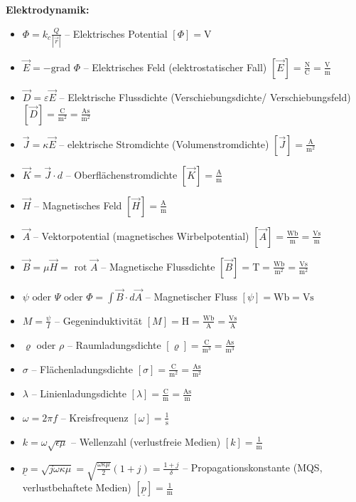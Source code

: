 \textbf{Elektrodynamik:}
\begin{itemize}
\item $\Phi = k_c \frac{Q}{|\vec{r}|}$ -- Elektrisches Potential \hfill $[\Phi] = \text{V}$
\item $\vec{E} = -\text{grad } \Phi$ -- Elektrisches Feld (elektrostatischer Fall) \hfill $[\vec{E}] = \frac{\text{N}}{\text{C}} = \frac{\text{V}}{\text{m}}$
\item $\vec{D} = \varepsilon \vec{E}$ -- Elektrische Flussdichte (Verschiebungsdichte/ Verschiebungsfeld) \hfill $[\vec{D}] = \frac{\text{C}}{\text{m}^2} = \frac{\text{As}}{\text{m}^2}$
\item $\vec{J} = \kappa \vec{E}$ -- elektrische Stromdichte (Volumenstromdichte) \hfill $[\vec{J}] = \frac{\text{A}}{\text{m}^2}$
\item $\vec{K} = \vec{J} \cdot d$ -- Oberflächenstromdichte \hfill $[\vec{K}] = \frac{\text{A}}{\text{m}}$
\item $\vec{H}$ -- Magnetisches Feld \hfill $[\vec{H}] = \frac{\text{A}}{\text{m}}$
\item $\vec{A}$ -- Vektorpotential (magnetisches Wirbelpotential) \hfill $[\vec{A}] = \frac{\text{Wb}}{\text{m}} = \frac{\text{Vs}}{\text{m}}$
\item $\vec{B} = \mu \vec{H} = \text{ rot }\vec{A}$ -- Magnetische Flussdichte \hfill $[\vec{B}] = \text{T} = \frac{\text{Wb}}{\text{m}^2} = \frac{\text{Vs}}{\text{m}^2}$
\item $\psi \text{ oder } \Psi \text{ oder } \Phi = \int \vec{B} \cdot d\vec{A}$ -- Magnetischer Fluss \hfill $[\psi] = \text{Wb} = \text{Vs}$
\item $M = \frac{\psi}{I}$ -- Gegeninduktivität \hfill $[M] = \text{H} = \frac{\text{Wb}}{\text{A}} = \frac{\text{Vs}}{\text{A}}$
\item $\varrho$ oder $\rho$ -- Raumladungsdichte \hfill $[\varrho] = \frac{\text{C}}{\text{m}^3} = \frac{\text{As}}{\text{m}^3}$
\item $\sigma$ -- Flächenladungsdichte \hfill $[\sigma] = \frac{\text{C}}{\text{m}^2} = \frac{\text{As}}{\text{m}^2}$
\item $\lambda$ -- Linienladungsdichte \hfill $[\lambda] = \frac{\text{C}}{\text{m}} = \frac{\text{As}}{\text{m}}$
\item $\omega = 2\pi f$ -- Kreisfrequenz \hfill $[\omega] = \frac{1}{\text{s}}$
\item $k = \omega \sqrt{\epsilon\mu}$ -- Wellenzahl (verlustfreie Medien)  \hfill $[k] = \frac{1}{\text{m}}$
\item $\underline{p} = \sqrt{j\omega\kappa\mu} = \sqrt{\frac{\omega\kappa\mu}{2}}(1+j) = \frac{1+j}{\delta}$ -- Propagationskonstante (MQS, verlustbehaftete Medien) \hfill  $[\underline{p}] = \frac{1}{\text{m}}$

\end{itemize}
